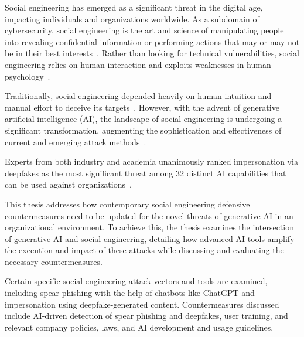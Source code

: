 %
%
Social engineering has emerged as a significant threat in the digital age, impacting individuals and organizations worldwide. As a subdomain of cybersecurity, social engineering is the art and science of manipulating people into revealing confidential information or performing actions that may or may not be in their best interests~\citep{hadnagy_Social_Engineering_The_Science_2018}. Rather than looking for technical vulnerabilities, social engineering relies on human interaction and exploits weaknesses in human psychology~\citep{wang_Defining_Social_Engineering_2020}.





%
%
Traditionally, social engineering depended heavily on human intuition and manual effort to deceive its targets~\citep{mitnick_The_Art_of_Deception_2003, mirsky_Threat_Offensive_AI_Organizations_2023}. However, with the advent of generative artificial intelligence (AI), the landscape of social engineering is undergoing a significant transformation, augmenting the sophistication and effectiveness of current and emerging attack methods~\citep{fakhouri_AI_Driven_Solutions_SE_Attacks_2024}.

Experts from both industry and academia unanimously ranked impersonation via deepfakes as the most significant threat among 32 distinct AI capabilities that can be used against organizations~\citep{mirsky_Threat_Offensive_AI_Organizations_2023}.






%
%
This thesis addresses how contemporary social engineering defensive countermeasures need to be updated for the novel threats of generative AI in an organizational environment. To achieve this, the thesis examines the intersection of generative AI and social engineering, detailing how advanced AI tools amplify the execution and impact of these attacks while discussing and evaluating the necessary countermeasures.





%
%
Certain specific social engineering attack vectors and tools are examined, including spear phishing with the help of chatbots like ChatGPT and impersonation using deepfake-generated content. Countermeasures discussed include AI-driven detection of spear phishing and deepfakes, user training, and relevant company policies, laws, and AI development and usage guidelines.





